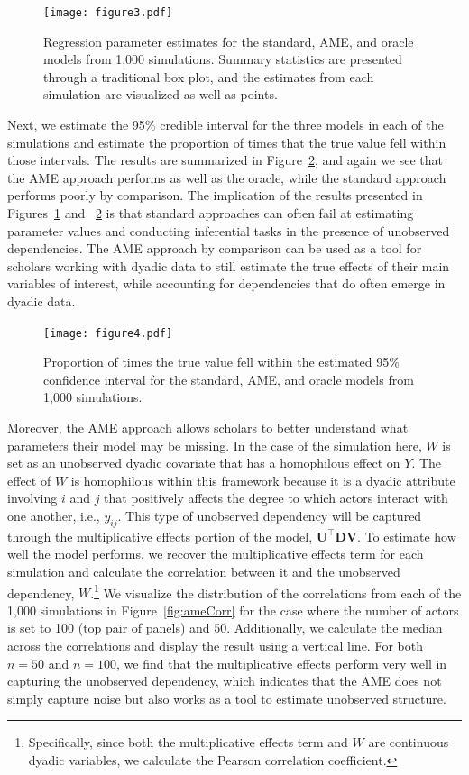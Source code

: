 \documentclass[12pt]{amsart}
\begin{document}
\begin{figure}
	\centering
	\caption{Regression parameter estimates for the standard, AME, and oracle models from 1,000 simulations. Summary statistics are presented through a traditional box plot, and the estimates from each simulation are visualized as well as points.}
	\label{fig:ameBias}
	\texttt{[image: figure3.pdf]} \\
\end{figure}

Next, we estimate the 95\% credible interval for the three models in each of the simulations and estimate the proportion of times that the true value fell within those intervals. The results are summarized in Figure~\ref{fig:ameCalib}, and again we see that the AME approach performs as well as the oracle, while the standard approach performs poorly by comparison. The implication of the results presented in Figures~\ref{fig:ameBias} and ~\ref{fig:ameCalib} is that standard approaches can often fail at estimating parameter values and conducting inferential tasks in the presence of unobserved dependencies. The AME approach by comparison can be used as a tool for scholars working with dyadic data to still estimate the true effects of their main variables of interest, while accounting for dependencies that do often emerge in dyadic data.

\begin{figure}
	\centering
	\caption{Proportion of times the true value fell within the estimated 95\% confidence interval for the standard, AME, and oracle models from 1,000 simulations.}
	\label{fig:ameCalib}
	\texttt{[image: figure4.pdf]} \\
\end{figure}

Moreover, the AME approach allows scholars to better understand what parameters their model may be missing. In the case of the simulation here, $W$ is set as an unobserved dyadic covariate that has a homophilous effect on $Y$. The effect of $W$ is homophilous within this framework because it is a dyadic attribute involving $i$ and $j$ that positively affects the degree to which actors interact with one another, i.e., $y_{ij}$. This type of unobserved dependency will be captured through the multiplicative effects portion of the model, $\mathbf{U}^{\top} \mathbf{D} \mathbf{V}$. To estimate how well the model performs, we recover the multiplicative effects term for each simulation and calculate the correlation between it and the unobserved dependency, $W$.\footnote{Specifically, since both the multiplicative effects term and $W$ are continuous dyadic variables, we calculate the Pearson correlation coefficient.} We visualize the distribution of the correlations from each of the 1,000 simulations in Figure~\ref{fig:ameCorr} for the case where the number of actors is set to 100 (top pair of panels) and 50. Additionally, we calculate the median across the correlations and display the result using a vertical line. For both $n=50$ and $n=100$, we find that the multiplicative effects perform very well in capturing the unobserved dependency, which indicates that the AME does not simply capture noise but also works as a tool to estimate unobserved structure.
\end{document}
